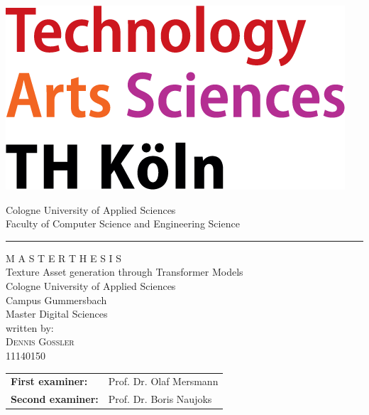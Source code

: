 \documentclass[a4paper,12pt,oneside]{article}
\begin{document}
    
    \pagestyle{empty}
    \begin{titlepage}
    \includegraphics[scale=1.00]{sources/logo_TH-Koeln_CMYK_22pt}\\
    \begin{center}
      \Large
      Cologne University of Applied Sciences\\
      Faculty of Computer Science and Engineering Science\\
      \hrule\par\rule{0pt}{2cm} %
      \LARGE
      \textsc{M A S T E R  T H E S I S}\\
      \vspace{1cm} %
      \huge
      Texture Asset generation through Transformer Models\\
      \vspace{1.5cm}
      \large
      Cologne University of Applied Sciences\\
      Campus Gummersbach\\
      Master Digital Sciences\\ 
      \vspace{1.0cm}
      written by:\\
      \textsc{Dennis Goßler}\\
      11140150\\
      \vspace{1.5cm}
      \begin{tabular}{ll} %
          \textbf{First examiner:} & Prof. Dr. Olaf Mersmann \\
          \textbf{Second examiner:} & Prof. Dr. Boris Naujoks \\
      \end{tabular}
    
    \end{center}    
    \end{titlepage}
    
\end{document}
